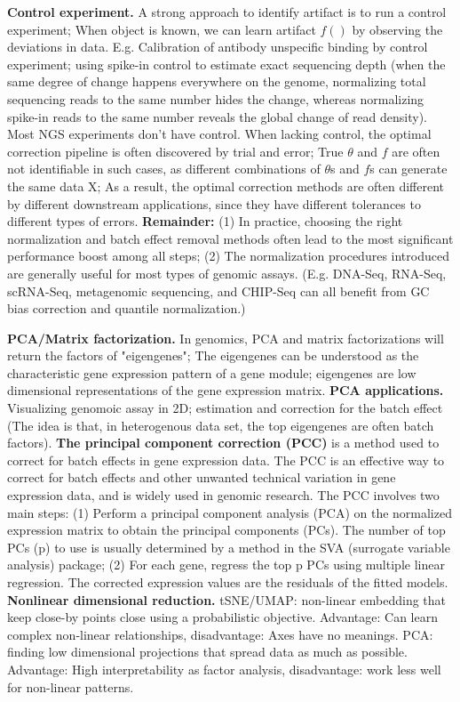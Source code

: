 \vspace{0.1em}\noindent
\textbf{Control experiment.} A strong approach to identify artifact is to run a control experiment; When object is known, we can learn artifact $f()$ by observing the deviations in data. E.g. Calibration of antibody unspecific binding by control experiment; using spike-in control to estimate exact sequencing depth (when the same degree of change happens everywhere on the genome, normalizing total sequencing reads to the same number hides the change, whereas normalizing spike-in reads to the same number reveals the global change of read density). Most NGS experiments don't have control. When lacking control, the optimal correction pipeline is often discovered by trial and error; True $\theta$ and $f$ are often not identifiable in such cases, as different combinations of $\theta$s and $f$s can generate the same data X; As a result, the optimal correction methods are often different by different downstream applications, since they have different tolerances to different types of errors. \textbf{Remainder:} (1) In practice, choosing the right normalization and batch effect removal methods often lead to the most significant performance boost among all steps; (2) The normalization procedures introduced are generally useful for most types of genomic assays. (E.g. DNA-Seq, RNA-Seq, scRNA-Seq, metagenomic sequencing, and CHIP-Seq can all benefit from GC bias correction and quantile normalization.)

\vspace{0.1em}\noindent
\textbf{PCA/Matrix factorization.} In genomics, PCA and matrix factorizations will return the factors of "eigengenes";  The eigengenes can be understood as the characteristic gene expression pattern of a gene module; eigengenes are low dimensional representations of the gene expression matrix. \textbf{PCA applications.} Visualizing genomoic assay in 2D; estimation and correction for the batch effect (The idea is that, in heterogenous data set, the top eigengenes are often batch factors). \textbf{The principal component correction (PCC)} is a method used  to correct for batch effects in gene expression data. The PCC is an effective way to correct for batch effects and other unwanted technical variation in gene expression data, and is widely used in genomic research. The PCC involves two main steps: (1) Perform a principal component analysis (PCA) on the normalized expression matrix to obtain the principal components (PCs). The number of top PCs (p) to use is usually determined by a method in the SVA (surrogate variable analysis) package; (2) For each gene, regress the top p PCs using multiple linear regression. The corrected expression values are the residuals of the fitted models. \textbf{Nonlinear dimensional reduction.} tSNE/UMAP: non-linear embedding that keep close-by points close using a probabilistic objective. Advantage: Can learn complex non-linear relationships, disadvantage: Axes have no meanings. PCA: finding low dimensional projections that spread data as much as possible. Advantage: High interpretability as factor analysis, disadvantage: work less well for non-linear patterns.


